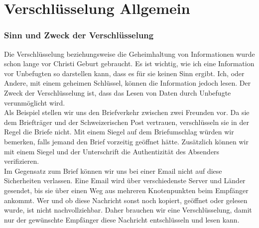 \part{Verschlüsselung Allgemein}
\section{Sinn und Zweck der Verschlüsselung}
Die Verschlüsselung beziehungsweise die Geheimhaltung von Informationen wurde schon lange vor Christi Geburt gebraucht. Es ist wichtig, wie ich eine Information vor Unbefugten so darstellen kann, dass es für sie keinen Sinn ergibt. Ich, oder Andere, mit einem geheimen Schlüssel, können die Information jedoch lesen. Der Zweck der Verschlüsselung ist, dass das Lesen von Daten durch Unbefugte verunmöglicht wird. \\
Als Beispiel stellen wir uns den Briefverkehr zwischen zwei Freunden vor. Da sie dem Briefträger und der Schweizerischen Post vertrauen, verschlüsseln sie in der Regel die Briefe nicht. Mit einem Siegel auf dem Briefumschlag würden wir bemerken, falls jemand den Brief vorzeitig geöffnet hätte. Zusätzlich können wir mit einem Siegel und der Unterschrift die Authentizität des Absenders verifizieren.\\
Im Gegensatz zum Brief können wir uns bei einer Email nicht auf diese Sicherheiten verlassen. Eine Email wird über verschiedenste Server und Länder gesendet, bis sie über einen Weg aus mehreren Knotenpunkten beim Empfänger ankommt. Wer und ob diese Nachricht sonst noch kopiert, geöffnet oder gelesen wurde, ist nicht nachvollziehbar. Daher brauchen wir eine Verschlüsselung, damit nur der gewünschte Empfänger diese Nachricht entschlüsseln und lesen kann.
%
%

